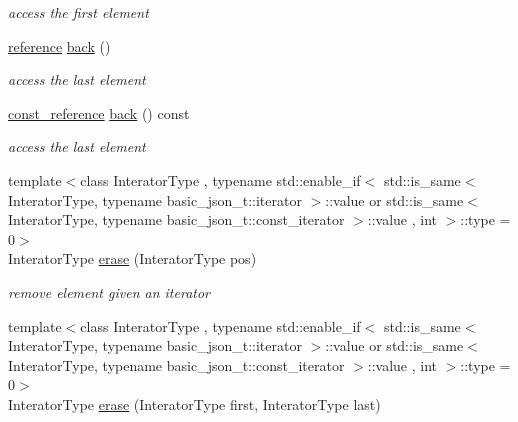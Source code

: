 \begin{DoxyCompactItemize}
\begin{DoxyCompactList}\small\item\em access the first element \end{DoxyCompactList}\item 
\hyperlink{a00025_a3ec8e17be8732fe436e9d6733f52b7a3}{reference} \hyperlink{a00025_a71b1d38ef402dfee58fba1fe01fa67f5}{back} ()
\begin{DoxyCompactList}\small\item\em access the last element \end{DoxyCompactList}\item 
\hyperlink{a00025_af677a29b0e66edc9f66e5167e4667071}{const\+\_\+reference} \hyperlink{a00025_a098482190447461f47f80b99bf2519f6}{back} () const 
\begin{DoxyCompactList}\small\item\em access the last element \end{DoxyCompactList}\item 
{\footnotesize template$<$class Interator\+Type , typename std\+::enable\+\_\+if$<$                                                                  std\+::is\+\_\+same$<$ Interator\+Type, typename basic\+\_\+json\+\_\+t\+::iterator $>$\+::value or                                                               std\+::is\+\_\+same$<$ Interator\+Type, typename basic\+\_\+json\+\_\+t\+::const\+\_\+iterator $>$\+::value                                                               , int $>$\+::type  = 0$>$ }\\Interator\+Type \hyperlink{a00025_a45e789042a23138eba2b69f34df9fc45}{erase} (Interator\+Type pos)
\begin{DoxyCompactList}\small\item\em remove element given an iterator \end{DoxyCompactList}\item 
{\footnotesize template$<$class Interator\+Type , typename std\+::enable\+\_\+if$<$                                                                  std\+::is\+\_\+same$<$ Interator\+Type, typename basic\+\_\+json\+\_\+t\+::iterator $>$\+::value or                                                               std\+::is\+\_\+same$<$ Interator\+Type, typename basic\+\_\+json\+\_\+t\+::const\+\_\+iterator $>$\+::value                                                               , int $>$\+::type  = 0$>$ }\\Interator\+Type \hyperlink{a00025_a263a9ecde33a1f2ff63dcd15d5e42cb7}{erase} (Interator\+Type first, Interator\+Type last)

\end{DoxyCompactItemize}
